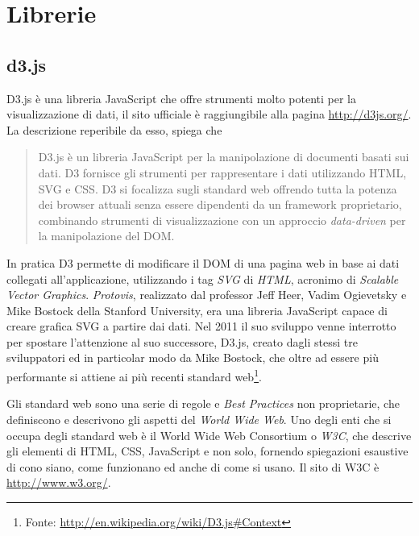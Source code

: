 \section{Librerie}\label{sec:librerie}
\subsection{d3.js}\label{sec:d3}
D3.js è una libreria JavaScript che offre strumenti molto potenti per la visualizzazione di dati, il sito ufficiale è raggiungibile alla pagina \url{http://d3js.org/}. La descrizione reperibile da esso, spiega che
\begin{quotation}
D3.js è un libreria JavaScript per la manipolazione di documenti basati sui dati. D3 fornisce gli strumenti per rappresentare i dati utilizzando HTML, SVG e CSS. D3 si focalizza sugli standard web offrendo tutta la potenza dei browser attuali senza essere dipendenti da un framework proprietario, combinando strumenti di visualizzazione con un approccio \emph{data-driven} per la manipolazione del DOM.
\end{quotation}
In pratica D3 permette di modificare il DOM di una pagina web in base ai dati collegati all'applicazione, utilizzando i tag \emph{SVG} di \emph{HTML}, acronimo di \emph{Scalable Vector Graphics}.
\emph{Protovis}, realizzato dal professor Jeff Heer, Vadim Ogievetsky e Mike Bostock della Stanford University, era una libreria JavaScript capace di creare grafica SVG a partire dai dati. Nel 2011 il suo sviluppo venne interrotto per spostare l'attenzione al suo successore, D3.js, creato dagli stessi tre sviluppatori ed in particolar modo da Mike Bostock, che oltre ad essere più performante si attiene ai più recenti standard web\footnote{Fonte: \url{http://en.wikipedia.org/wiki/D3.js\#Context}}. 

Gli standard web sono una serie di regole e \emph{Best Practices} non proprietarie, che definiscono e descrivono gli aspetti del \emph{World Wide Web}. Uno degli enti che si occupa degli standard web è il World Wide Web Consortium o \emph{W3C}, che descrive gli elementi di HTML, CSS, JavaScript e non solo, fornendo spiegazioni esaustive di cono siano, come funzionano ed anche di come si usano. Il sito di W3C è \url{http://www.w3.org/}.

